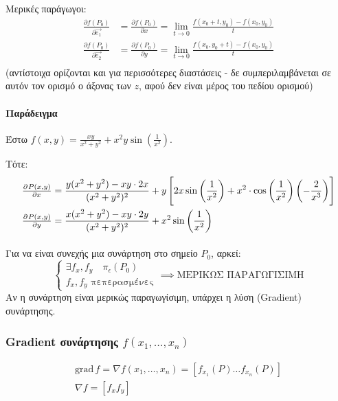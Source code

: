 \documentclass[11pt,a4paper,titlepage]{article}
\newcommand{\textlatin}[1]{#1}
\begin{document}
Μερικές παράγωγοι:
\begin{align*}
\frac{\partial f(P_0)}{\partial \vec{e_1}} &= \frac{\partial f(P_0)}{\partial x} = \lim_{t\to0} \frac{f(x_0+t,y_0)-f(x_0,y_0)}{t} \\
\frac{\partial f(P_0)}{\partial \vec{e_2}} &= \frac{\partial f(P_0)}{\partial y} = \lim_{t\to0} \frac{f(x_0,y_0+t)-f(x_0,y_0)}{t} \\
\end{align*}
(αντίστοιχα ορίζονται και για περισσότερες διαστάσεις - δε συμπεριλαμβάνεται σε αυτόν τον ορισμό ο άξονας των \(z\), αφού δεν είναι μέρος του πεδίου ορισμού)

\paragraph{Παράδειγμα}
Έστω \(f(x,y)=\frac{xy}{x^2+y^2}+x^2y\sin\left(\frac{1}{x^2}\right)\).

Τότε:
\begin{align*}
\pd{P(x,y)}{x} &= \frac{y(x^2+y^2)-xy\cdot2x}{(x^2+y^2)^2}
+ y \left[
2x\sin\left(\frac{1}{x^2}\right)
+x^2 \cdot \cos\left( \frac{1}{x^2}\right)\left( -\frac{2}{x^3} \right)
\right] \\
\pd{P(x,y)}{y} &=\frac{x(x^2+y^2)-xy\cdot2y}{(x^2+y^2)^2}+x^2\sin \left( \frac{1}{x^2}\right)
\end{align*}

\paragraph{}
Για να είναι συνεχής μια συνάρτηση στο σημείο \(P_0\), αρκεί:
\[
\begin{cases}
\exists f_x, f_y\quad \pi_\epsilon (P_0) \\
f_x,f_y\text{ πεπερασμένες}
\end{cases}
\implies\text{ΜΕΡΙΚΩΣ ΠΑΡΑΓΩΓΙΣΙΜΗ}
\]
Αν η συνάρτηση είναι μερικώς παραγωγίσιμη, υπάρχει η λύση (\textlatin{Gradient}) συνάρτησης.

\subsubsection{\textlatin{Gradient} συνάρτησης \(f(x_1,\dots,x_n)\)}
\begin{gather*}
\mathrm{grad}\,f = \nabla f(x_1,\dots,x_n) =
\left[
f_{x_1}(P)\dots f_{x_n}(P)
\right] \\
\nabla f = \left[ f_x f_y \right]
\end{gather*}
\end{document}
